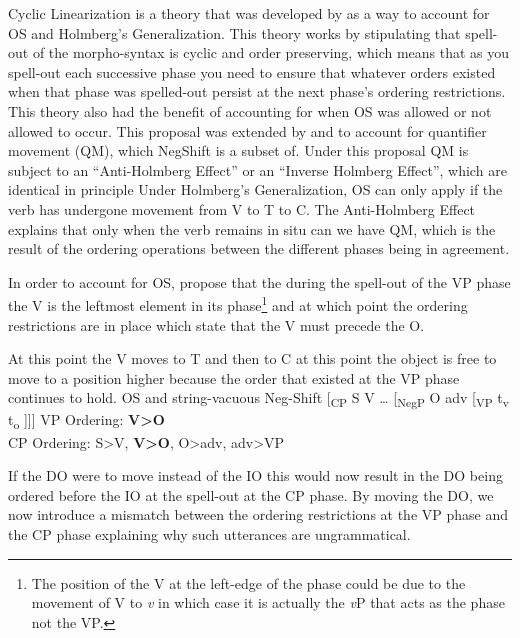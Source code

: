 \documentclass[12pt, letterpaper]{article}
\begin{document}
\ea Cyclic Linearization is a theory that was developed by \cite{foxCyclicLinearizationSyntactic2005} as a way to account for OS and Holmberg's Generalization.
\ex This theory works by stipulating that spell-out of the morpho-syntax is cyclic and order preserving, which means that as you spell-out each successive phase you need to ensure that whatever orders existed when that phase was spelled-out persist at the next phase's ordering restrictions. This theory also had the benefit of accounting for when OS was allowed or not allowed to occur. 
\ex This proposal was extended by \citet{foxCyclicLinearizationSyntactic2005} and \citet{engelsMicrovariationObjectPositions2011,engelsScandinavianNegativeIndefinites2012} to account for quantifier movement (QM), which NegShift is a subset of. 
\ex Under this proposal QM is subject to an ``Anti-Holmberg Effect'' or an ``Inverse Holmberg Effect'', which are identical in principle
	\ea Under Holmberg's Generalization, OS can only apply if the verb has undergone movement from V to T to C.
	\ex The Anti-Holmberg Effect explains that only when the verb remains in situ can we have QM, which is the result of the ordering operations between the different phases being in agreement. 
	\z
	\vspace{6pt} 

\ex In order to account for OS, \citeauthor{foxCyclicLinearizationSyntactic2005} propose that the during the spell-out of the VP phase the V is the leftmost element in its phase\footnote{The position of the V at the left-edge of the phase could be due to the movement of V to \textit{v} in which case it is actually the \textit{v}P that acts as the phase not the VP.} and at which point the ordering restrictions are in place which state that the V must precede the O. 

\ex At this point the V moves to T and then to C at this point the object is free to move to a position higher because the order that existed at the VP phase continues to hold. 
\ex OS and string-vacuous Neg-Shift
 	\ea {}[\textsubscript{CP} S V … [\textsubscript{NegP} O adv [\textsubscript{VP} t\textsubscript{v} t\textsubscript{o} ]]]
	\vspace{6pt}
	\ex VP Ordering: \textbf{V>O}\\
		CP Ordering: S>V, \textbf{V>O}, O>adv, adv>VP
	\z

\ex If the DO were to move instead of the IO this would now result in the DO being ordered before the IO at the spell-out at the CP phase. By moving the DO, we now introduce a mismatch between the ordering restrictions at the VP phase and the CP phase explaining why such utterances are ungrammatical. 
\end{document}
